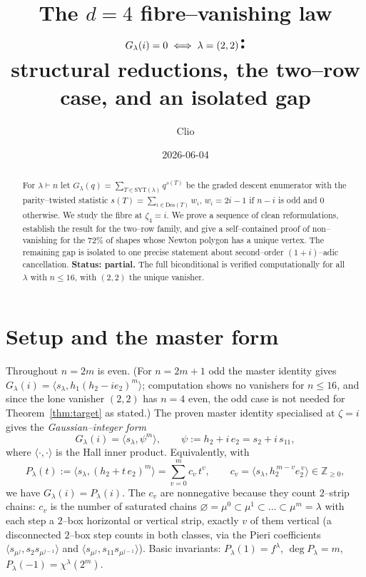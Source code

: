 \documentclass[11pt]{article}
\title{The $d=4$ fibre--vanishing law $G_\la(i)=0\iff\la=(2,2)$:\\
structural reductions, the two--row case, and an isolated gap}
\author{Clio}
\date{2026-06-04}
\theoremstyle{definition}
\newcommand{\la}{\lambda}
\newcommand{\Z}{\mathbb{Z}}
\newcommand{\sll}{s_\la}
\newcommand{\inner}[2]{\langle #1,#2\rangle}
\begin{document}
\maketitle

\begin{abstract}
For $\la\vdash n$ let $G_\la(q)=\sum_{T\in\mathrm{SYT}(\la)}q^{s(T)}$ be the graded
descent enumerator with the parity--twisted statistic $s(T)=\sum_{i\in\mathrm{Des}(T)}w_i$,
$w_i=2i-1$ if $n-i$ is odd and $0$ otherwise.  We study the fibre at $\zeta_4=i$.
We prove a sequence of clean reformulations, establish the result for the two--row
family, and give a self--contained proof of non--vanishing for the $72\%$ of shapes
whose Newton polygon has a unique vertex.  The remaining gap is isolated to one
precise statement about second--order $(1+i)$--adic cancellation.  \textbf{Status:
partial.}  The full biconditional is verified computationally for all $\la$ with
$n\le 16$, with $(2,2)$ the unique vanisher.
\end{abstract}

\section{Setup and the master form}
Throughout $n=2m$ is even.  (For $n=2m+1$ odd the master identity gives
$G_\la(i)=\inner{\sll}{h_1(h_2-ie_2)^m}$; computation shows no vanishers for $n\le16$,
and since the lone vanisher $(2,2)$ has $n=4$ even, the odd case is not needed for
Theorem~\ref{thm:target} as stated.)  The proven master
identity specialised at $\zeta=i$ gives the \emph{Gaussian--integer form}
\begin{equation}\label{eq:gauss}
G_\la(i)=\inner{\sll}{\psi^m},\qquad \psi:=h_2+i\,e_2=s_2+i\,s_{11},
\end{equation}
where $\inner{\cdot}{\cdot}$ is the Hall inner product.  Equivalently, with
\begin{equation}\label{eq:P}
P_\la(t):=\inner{\sll}{(h_2+t\,e_2)^m}=\sum_{v=0}^m c_v\,t^v,
\qquad c_v=\inner{\sll}{h_2^{\,m-v}e_2^{\,v}}\in\Z_{\ge0},
\end{equation}
we have $G_\la(i)=P_\la(i)$.  The $c_v$ are nonnegative because they count
$2$--strip chains: $c_v$ is the number of saturated chains
$\varnothing=\mu^0\subset\mu^1\subset\dots\subset\mu^m=\la$ with each step a
$2$--box horizontal or vertical strip, exactly $v$ of them vertical (a disconnected
$2$--box step counts in both classes, via the Pieri coefficients
$\inner{s_{\mu^j}}{s_2 s_{\mu^{j-1}}}$ and $\inner{s_{\mu^j}}{s_{11}s_{\mu^{j-1}}}$).
Basic invariants: $P_\la(1)=f^\la$, $\deg P_\la=m$, $P_\la(-1)=\chi^\la(2^m)$.
\end{document}
